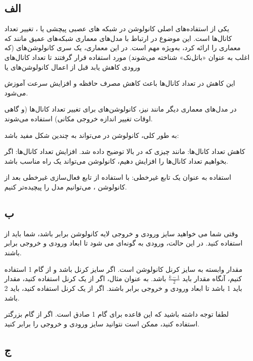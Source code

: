 \subsection*{الف}

یکی از استفاده‌های اصلی کانولوشن
در شبکه های عصبی پیچشی یا
، تغییر تعداد کانال‌ها 
است. این موضوع در ارتباط با مدل‌های معماری شبکه‌های عمیق مانند
که معماری
را ارائه کرد، به‌ویژه مهم است. در این معماری، یک سری کانولوشن‌های
(که اغلب به عنوان «باتل‌نک» شناخته می‌شوند) مورد استفاده قرار گرفتند تا تعداد کانال‌های ورودی کاهش یابد قبل از اعمال کانولوشن‌های
یا

این کاهش در تعداد کانال‌ها باعث کاهش مصرف حافظه و افزایش سرعت آموزش می‌شود.

در مدل‌های معماری دیگر مانند
نیز، کانولوشن‌های
برای تغییر تعداد کانال‌ها (و گاهی اوقات تغییر اندازه خروجی مکانی) استفاده می‌شوند.

به طور کلی، کانولوشن
در
می‌تواند به چندین شکل مفید باشد:

کاهش تعداد کانال‌ها: مانند چیزی که در بالا توضیح داده شد.
افزایش تعداد کانال‌ها: اگر بخواهیم تعداد کانال‌ها را افزایش دهیم، کانولوشن
می‌تواند یک راه مناسب باشد.

استفاده به عنوان یک تابع غیرخطی: با استفاده از تابع فعال‌سازی غیرخطی بعد از کانولوشن
، می‌توانیم مدل را پیچیده‌تر کنیم.

\subsection*{ب}

وقتی شما می خواهید سایز ورودی و خروجی لایه کانولوشن برابر باشد، شما باید از
استفاده کنید. در این حالت، ورودی به گونه‌ای 
 می شود تا ابعاد ورودی و خروجی برابر باشند.

مقدار 
 وابسته به سایز کرنل کانولوشن است. اگر سایز کرنل
باشد و از گام 1 
استفاده کنیم، آنگاه مقدار 
 باید
$\frac{k-1}{2}$
باشد. به عنوان مثال، اگر از یک کرنل
استفاده کنید، مقدار 
 باید 1 باشد تا ابعاد ورودی و خروجی برابر باشند. اگر از یک کرنل
استفاده کنید، 
 باید 2 باشد.

لطفا توجه داشته باشید که این قاعده برای گام 1 صادق است. اگر از گام بزرگتر استفاده کنید، ممکن است نتوانید سایز ورودی و خروجی را برابر کنید.

\subsection*{ج}


